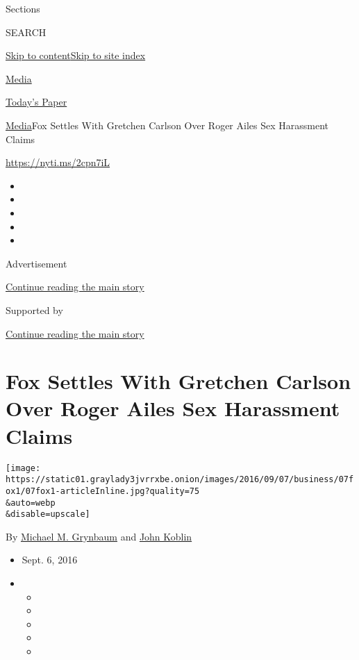 Sections

SEARCH

\protect\hyperlink{site-content}{Skip to
content}\protect\hyperlink{site-index}{Skip to site index}

\href{https://www.nytimes3xbfgragh.onion/section/business/media}{Media}

\href{https://myaccount.nytimes3xbfgragh.onion/auth/login?response_type=cookie\&client_id=vi}{}

\href{https://www.nytimes3xbfgragh.onion/section/todayspaper}{Today's
Paper}

\href{/section/business/media}{Media}\textbar{}Fox Settles With Gretchen
Carlson Over Roger Ailes Sex Harassment Claims

\url{https://nyti.ms/2cpn7iL}

\begin{itemize}
\item
\item
\item
\item
\item
\end{itemize}

Advertisement

\protect\hyperlink{after-top}{Continue reading the main story}

Supported by

\protect\hyperlink{after-sponsor}{Continue reading the main story}

\hypertarget{fox-settles-with-gretchen-carlson-over-roger-ailes-sex-harassment-claims}{%
\section{Fox Settles With Gretchen Carlson Over Roger Ailes Sex
Harassment
Claims}\label{fox-settles-with-gretchen-carlson-over-roger-ailes-sex-harassment-claims}}

\texttt{[image: https://static01.graylady3jvrrxbe.onion/images/2016/09/07/business/07fox1/07fox1-articleInline.jpg?quality=75\\\&auto=webp\\\&disable=upscale]}

By
\href{http://www.nytimes3xbfgragh.onion/by/michael-m-grynbaum}{Michael
M. Grynbaum} and
\href{https://www.nytimes3xbfgragh.onion/by/john-koblin}{John Koblin}

\begin{itemize}
\item
  Sept. 6, 2016
\item
  \begin{itemize}
  \item
  \item
  \item
  \item
  \item
  \end{itemize}
\end{itemize}

